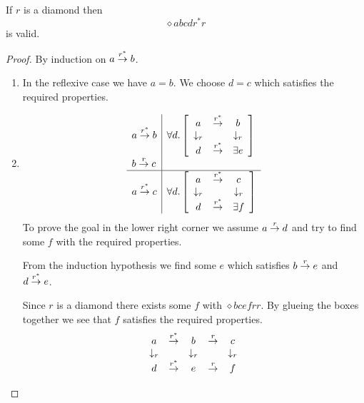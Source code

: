 \begin{lemma}
    \label{StripLemma1}
    If $r$ is a diamond then
    $$
    \diamond a b c d {r^*} r
    $$
    is valid.

    \begin{proof}
        By induction on $a \torel{r^*} b$.

        \begin{enumerate}
        \item In the reflexive case we have $a = b$. We choose $d = c$ which
        satisfies the required properties.

        \item
            $$
            \begin{array}{l|l}
                a \torel{r^*} b
                &
                \allbracket d {\diamond a b d e {r^*} r}
                \\
                b \torel r c
                \\
                \hline
                a \torel{r^*} c
                &
                \allbracket d {\diamond a c d f {r^*} r}
            \end{array}
            $$
            To prove the goal in the lower right corner we assume $a \torel r d$
            and try to find some $f$ with the required properties.

            From the induction hypothesis we find some $e$ which satisfies $b
            \torel r e$ and $d \torel{r^*} e$.

            Since $r$ is a diamond there exists some $f$ with $\diamond b c e f
            r r$. By glueing the boxes together we see that $f$ satisfies
            the required properties.
            $$
            \begin{array}{ccccc}
                a            &\torel{r^*}& b           &\torel r& c
                \\
                \downarrow_r &           & \downarrow_r&        & \downarrow_r
                \\
                d            &\torel{r^*}& e           &\torel r& f
            \end{array}
            $$
        \end{enumerate}
    \end{proof}

\end{lemma}



